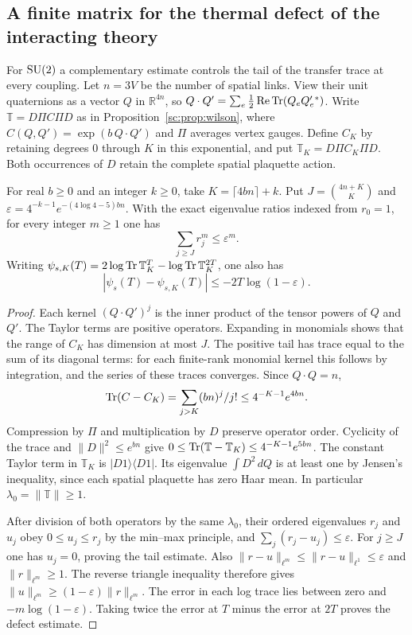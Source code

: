 \subsection{A finite matrix for the thermal defect of the interacting theory}
For $\mathrm{SU}(2)$ a complementary estimate controls the tail of the transfer
trace at every coupling. Let $n=3V$ be the number of spatial links.
View their unit quaternions as a vector $Q$ in $\mathbb R^{4n}$, so
$Q\cdot Q'= \sum_e \tfrac12\operatorname{Re}\operatorname{Tr}(Q_e Q_e'{}^*)$.
Write $\mathbb T=D\Pi C\Pi D$ as in Proposition~\ref{sc:prop:wilson},
where $C(Q,Q')=\exp(b\,Q\cdot Q')$ and $\Pi$ averages vertex gauges.
Define $C_K$ by retaining degrees $0$ through $K$ in this exponential,
and put $\mathbb T_K=D\Pi C_K\Pi D$. Both occurrences of $D$ retain
the complete spatial plaquette action.

\begin{proposition}\label{cl:prop:finite-matrix-seam}
For real $b\ge0$ and an integer $k\ge0$, take $K=\lceil4bn\rceil+k$.
Put $J=\binom{4n+K}{K}$ and
$\varepsilon=4^{-k-1}e^{-(4\log4-5)bn}$. With the exact eigenvalue
ratios indexed from $r_0=1$, for every integer $m\ge1$ one has
\[
 \sum_{j\ge J}r_j^m\le\varepsilon^m.
\]
Writing $\psi_{s,K}(T)=2\log\operatorname{Tr}\mathbb T_K^T-\log\operatorname{Tr}\mathbb T_K^{2T}$,
one also has
\[
 |\psi_s(T)-\psi_{s,K}(T)|\le -2T\log(1-\varepsilon).
\]
\end{proposition}
\begin{proof}
Each kernel $(Q\cdot Q')^j$ is the inner product of the tensor powers of
$Q$ and $Q'$. The Taylor terms are positive operators. Expanding in
monomials shows that the range of $C_K$ has dimension at most $J$.
The positive tail has trace equal to the sum of its diagonal terms:
for each finite-rank monomial kernel this follows by integration, and
the series of these traces converges. Since $Q\cdot Q=n$,
\[
 \operatorname{Tr}(C-C_K)=\sum_{j>K}(bn)^j/j!
 \le 4^{-K-1}e^{4bn}.
\]
Compression by $\Pi$ and multiplication by $D$ preserve operator order.
Cyclicity of the trace and $\|D\|^2\le e^{bn}$ give
$0\le \operatorname{Tr}(\mathbb T-\mathbb T_K)\le 4^{-K-1}e^{5bn}$.
The constant Taylor term in $\mathbb T_K$ is
$|D1\rangle\langle D1|$. Its eigenvalue $\int D^2\,dQ$ is at least
one by Jensen's inequality, since each spatial plaquette has zero Haar
mean. In particular $\lambda_0=\|\mathbb T\|\ge1$.

After division of both operators by the same $\lambda_0$, their ordered
eigenvalues $r_j$ and $u_j$ obey $0\le u_j\le r_j$ by the min--max
principle, and $\sum_j(r_j-u_j)\le\varepsilon$. For $j\ge J$ one has
$u_j=0$, proving the tail estimate. Also
$\|r-u\|_{\ell^m}\le\|r-u\|_{\ell^1}\le\varepsilon$
and $\|r\|_{\ell^m}\ge1$. The reverse triangle inequality therefore gives
$\|u\|_{\ell^m}\ge(1-\varepsilon)\|r\|_{\ell^m}$. The error
in each log trace lies between zero and $-m\log(1-\varepsilon)$.
Taking twice the error at $T$ minus the error at $2T$ proves the
defect estimate.
\end{proof}

